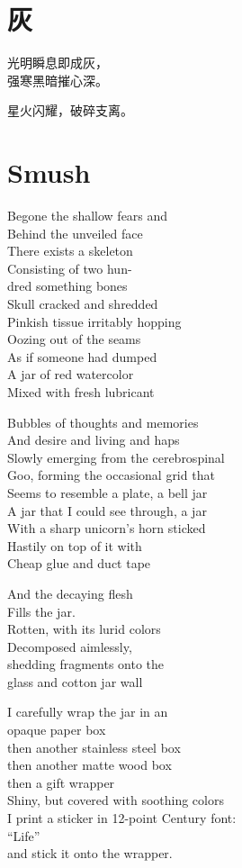 \documentclass[parskip=half-,12pt,oneside,openany,a5paper,numbers=endperiod]{scrbook}
\begin{document}
\endgroup

\chapter{灰}
\begingroup\addtolength{\baselineskip}{0.75ex}

光明瞬息即成灰，\\
强寒黑暗摧心深。

星火闪耀，破碎支离。

\endgroup

\chapter{Smush}

Begone the shallow fears and\\
Behind the unveiled face\\
There exists a skeleton\\
Consisting of two hun-\\
dred something bones\\
Skull cracked and shredded\\
Pinkish tissue irritably hopping\\
Oozing out of the seams\\
As if someone had dumped\\
A jar of red watercolor\\
Mixed with fresh lubricant

Bubbles of thoughts and memories\\
And desire and living and haps\\
Slowly emerging from the cerebrospinal\\
Goo, forming the occasional grid that\\
Seems to resemble a plate, a bell jar\\
A jar that I could see through, a jar\\
With a sharp unicorn's horn sticked\\
Hastily on top of it with\\
Cheap glue and duct tape

And the decaying flesh\\
Fills the jar.\\
Rotten, with its lurid colors\\
Decomposed aimlessly,\\
shedding fragments onto the\\
glass and cotton jar wall

I carefully wrap the jar in an\\
opaque paper box\\
then another stainless steel box\\
then another matte wood box\\
then a gift wrapper\\
Shiny, but covered with soothing colors\\
I print a sticker in 12-point Century font:\\
\qquad ``Life''\\
and stick it onto the wrapper.
\end{document}
